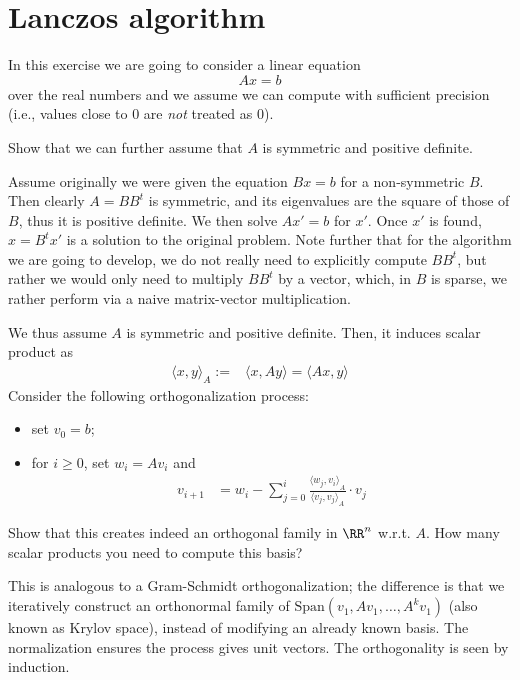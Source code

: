 \documentclass[11pt]{exam}
\newcommand*{\ScProd}[2]{\ensuremath{\langle#1\!\mathbin{,}\!#2\rangle}} %
\theoremstyle{definition}
\begin{document}
{\begin{questions}
\end{questions}

\section{Lanczos algorithm}
	In this exercise we are going to consider a linear equation
	\[
		A x = b
	\] 
	over the real numbers and we assume we can compute with sufficient precision (i.e., values close to 0 are \emph{not} treated as 0). 
	\begin{questions}
		\question Show that we can further assume that $A$ is symmetric and positive definite.  
		\begin{solution}
			Assume originally we were given the equation $B x = b$ for a non-symmetric $B$. Then clearly $A = BB^t$ is symmetric, and its eigenvalues are the square of those of $B$, thus it is positive definite. We then solve $Ax' = b$ for $x'$. Once $x'$ is found, $x = B^t x'$ is a solution to the original problem. Note further that for the algorithm we are going to develop, we do not really need to explicitly compute $B B^t$, but rather we would only need to multiply $B B^t$ by a vector, which, in $B$ is sparse, we rather perform via a naive matrix-vector multiplication.
		\end{solution}
	
		\question We thus assume $A$ is symmetric and positive definite.  Then, it induces scalar product as
		\begin{align*}
                  \ScProd{x}{y}_A :=& \ScProd{x}{Ay} = \ScProd{Ax}{y}%
		\end{align*}
		Consider the following orthogonalization process:
			\begin{itemize}
				\item set $v_0 = b$;
				\item for $i\geq 0$, set $w_i = A v_{i}$ and  
				\begin{align*}
                                  v_{i+1} &= w_i - \sum_{j =0}^{i} \frac{\ScProd{w_j}{v_i}_A}{\ScProd{v_j}{v_j}_A}\cdot v_j
                                \end{align*}
			\end{itemize}
			Show that this creates indeed an orthogonal family in $\RR^n$ w.r.t. $A$. How many scalar products you need to compute this basis?
			\begin{solution}
                          This is analogous to a Gram-Schmidt orthogonalization; the difference is that we iteratively construct an orthonormal family of $\mbox{Span}(v_1, Av_1,\dotsc, A^kv_1)$ (also known as Krylov space), instead of modifying an already known basis. The normalization ensures the process gives unit vectors. The orthogonality is seen by induction.


\end{solution}
\end{questions}}
\end{document}

